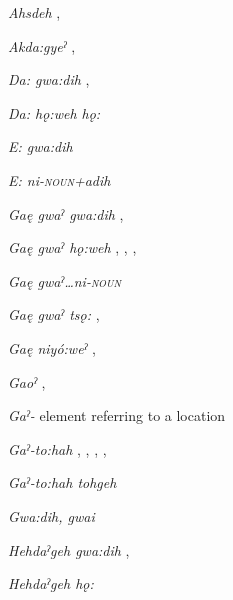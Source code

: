 \begin{CayugaRelated}
    \item{} \textit{Ahsdeh} , 

\item{} \textit{Akda:gyeˀ} , 

\item{} \textit{Da: gwa:dih} , 

\item{} \textit{Da: hǫ:weh hǫ:} 

\item{} \textit{E: gwa:dih} 

\item{} \textit{E: ni-\textsc{noun}+adih} 

\item{} \textit{Gaę gwaˀ gwa:dih} , 

\item{} \textit{Gaę gwaˀ hǫ:weh} , , , 

\item{} \textit{Gaę gwaˀ…ni-\textsc{noun}} 

\item{} \textit{Gaę gwaˀ tsǫ:} , 

\item{} \textit{Gaę niyó:weˀ} , 

\item{} \textit{Gaoˀ} , 

\item{} \textit{Gaˀ-} element referring to a location

\item{} \textit{Gaˀ-to:hah} , , , , 

\item{} \textit{Gaˀ-to:hah tohgeh} 

\item{} \textit{Gwa:dih, gwai} 

\item{} \textit{Hehdaˀgeh gwa:dih} , 

\item{} \textit{Hehdaˀgeh hǫ:} 


\end{CayugaRelated}
